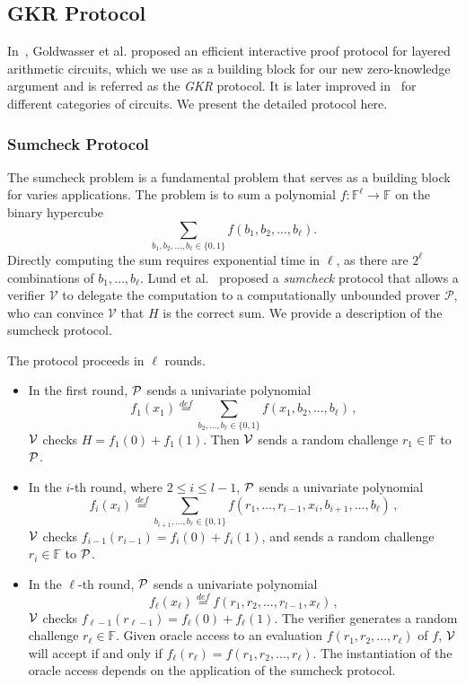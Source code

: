 
\subsection{GKR Protocol}\label{subsec::GKR}

In~\cite{GKR}, Goldwasser et al. proposed an efficient interactive proof protocol for layered arithmetic circuits, which we use as a building block for our new zero-knowledge argument and is referred as the \emph{GKR} protocol. It is later improved in~\cite{CMT,t13, wahby2017full,vram} for different categories of circuits. We present the detailed protocol here.



\subsubsection{Sumcheck Protocol}
\label{subsec::sumcheck}
The sumcheck problem is a fundamental problem that serves as a building block for varies applications. The problem is to sum a polynomial $f: \mathbb{F}^\ell \rightarrow \mathbb{F}$ on the binary hypercube $$\sum\limits_{b_1,b_2,\ldots,b_\ell\in\{0,1\}}f(b_1,b_2,...,b_\ell).$$ 
Directly computing the sum requires exponential time in $\ell$, as there are $2^\ell$ combinations of $b_1,\ldots,b_\ell$. Lund et al.~\cite{sumcheck} proposed a \emph{sumcheck} protocol that allows a verifier $\mathcal{V}$ to delegate the computation to a computationally unbounded prover $\mathcal{P}$, who can convince $\mathcal{V}$ that $H$ is the correct sum. We provide a description of the sumcheck protocol.

\begin{protocol}
	\label{prot::sumcheck}
	The protocol proceeds in $\ell$ rounds. 
	\begin{itemize}
		\item In the first round, $\P$ sends a univariate polynomial $$f_1(x_1)\overset{def}{=}\sum\limits_{b_2,\ldots,b_\ell\in\{0,1\}}f(x_1,b_2,...,b_\ell)\, ,$$ $\V$ checks $H=f_1(0)+f_1(1)$. Then $\V$ sends a random challenge $r_1\in\mathbb{F}$ to $\P$.
		\item In the $i$-th round, where $2\le i \le l-1$, $\P$ sends a univariate polynomial
		$$f_{i}(x_{i})\overset{def}{=}\sum\limits_{b_{i+1},\ldots,b_\ell\in\{0,1\}}f(r_1,\ldots, r_{i-1}, x_{i}, b_{i+1},\ldots, b_{\ell})\, ,$$ 
		$\V$ checks $f_{i-1}(r_{i-1})=f_{i}(0)+f_{i}(1)$, and sends a random challenge $r_{i}\in\mathbb{F}$ to $\P$.
		\item In the $\ell$-th round, $\P$ sends a univariate polynomial $$f_{\ell}(x_{\ell})\overset{def}{=}f(r_1, r_2, ..., r_{l-1}, x_{\ell})\, ,$$ $\V$ checks $f_{\ell-1}(r_{\ell-1})=f_{\ell}(0)+f_{\ell}(1)$. The verifier generates a random challenge $r_{\ell}\in\mathbb{F}$. Given oracle access to an evaluation $f(r_1, r_2, ..., r_\ell)$ of $f$, $\V$ will accept if and only if $f_{\ell}(r_\ell) = f(r_1, r_2, ..., r_\ell)$. The instantiation of the oracle access depends on the application of the sumcheck protocol.
	\end{itemize}
\end{protocol}

